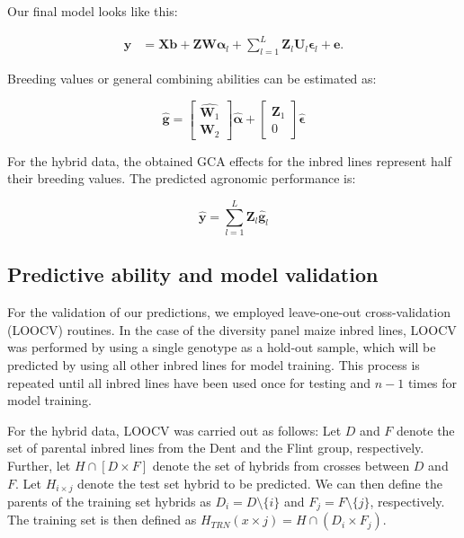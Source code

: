 \documentclass[12pt,titlepage]{article}
\begin{document}
Our final model looks like this:

\begin{align} \label{eq:final-model}
\mathbf{y} &= \mathbf{Xb} +
\mathbf{Z}\mathbf{W} \boldsymbol{\alpha}_{l} + 
\sum_{l=1}^{L} \mathbf{Z}_{l}\mathbf{U}_{l} \boldsymbol{\epsilon}_{l} +
\mathbf{e}.
\end{align}


Breeding values or general combining abilities can be estimated as:

\begin{equation} \label{eq:breeding-values}
\hat{\mathbf{g}} = 
 \begin{bmatrix}
  \hat{\mathbf{W}_1} \\
  \mathbf{W}_2 
 \end{bmatrix}
 \hat{\boldsymbol{\alpha}}
 + 
 \begin{bmatrix}
  \mathbf{Z}_1 \\
  0
 \end{bmatrix}
 \hat{\boldsymbol{\epsilon}} 
\end{equation}

For the hybrid data, the obtained GCA effects for the inbred lines represent 
half their breeding values.
The predicted agronomic performance is:

\begin{equation} \label{eq:predicted-performance}
\hat{\mathbf{y}} = \sum_{l=1}^{L} \mathbf{Z}_{l}\hat{\mathbf{g}}_{l} 
\end{equation}


\subsection{Predictive ability and model validation}
For the validation of our predictions, we employed leave-one-out
cross-validation (LOOCV) routines.
In the case of the diversity panel maize inbred lines, LOOCV was performed by 
using a single genotype as a hold-out sample, which will be predicted by using
all other inbred lines for model training.
This process is repeated until all inbred lines have been used once for testing
and $n - 1$ times for model training.

For the hybrid data, LOOCV was carried out as follows:
Let $D$ and $F$ denote the set of parental inbred lines from the Dent and the 
Flint group, respectively.
Further, let $H \cap [D \times F]$ denote the set of hybrids from crosses 
between $D$ and $F$.
Let $H_{i \times j}$ denote the test set hybrid to be predicted.
We can then define the parents of the training set hybrids as
$D_{i} = D \setminus \{i\}$ and $F_{j} = F \setminus \{j\}$, respectively.
The training set is then defined as 
$H_{TRN}(x \times j) = H \cap (D_{i} \times F_{j})$.
\end{document}
